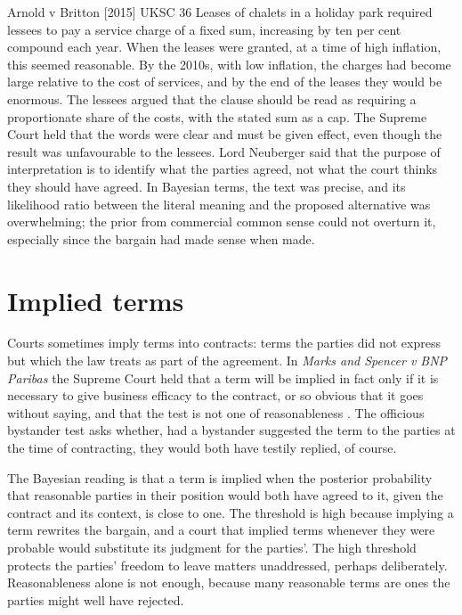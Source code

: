 \begin{casebox}{Arnold v Britton [2015] UKSC 36}
Leases of chalets in a holiday park required lessees to pay a service charge of a fixed sum, increasing by ten per cent compound each year. When the leases were granted, at a time of high inflation, this seemed reasonable. By the 2010s, with low inflation, the charges had become large relative to the cost of services, and by the end of the leases they would be enormous. The lessees argued that the clause should be read as requiring a proportionate share of the costs, with the stated sum as a cap. The Supreme Court held that the words were clear and must be given effect, even though the result was unfavourable to the lessees. Lord Neuberger said that the purpose of interpretation is to identify what the parties agreed, not what the court thinks they should have agreed. In Bayesian terms, the text was precise, and its likelihood ratio between the literal meaning and the proposed alternative was overwhelming; the prior from commercial common sense could not overturn it, especially since the bargain had made sense when made.
\end{casebox}

\section{Implied terms}

Courts sometimes imply terms into contracts: terms the parties did not express but which the law treats as part of the agreement. In \emph{Marks and Spencer v BNP Paribas} the Supreme Court held that a term will be implied in fact only if it is necessary to give business efficacy to the contract, or so obvious that it goes without saying, and that the test is not one of reasonableness \citep{marks2015}. The officious bystander test asks whether, had a bystander suggested the term to the parties at the time of contracting, they would both have testily replied, of course.

The Bayesian reading is that a term is implied when the posterior probability that reasonable parties in their position would both have agreed to it, given the contract and its context, is close to one. The threshold is high because implying a term rewrites the bargain, and a court that implied terms whenever they were probable would substitute its judgment for the parties'. The high threshold protects the parties' freedom to leave matters unaddressed, perhaps deliberately. Reasonableness alone is not enough, because many reasonable terms are ones the parties might well have rejected.

